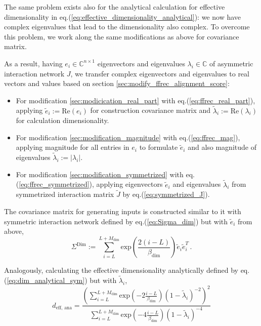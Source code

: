 \documentclass[11pt]{article}
\begin{document}
{	The same problem exists also for the analytical calculation for effective dimensionality in  eq.(\ref{eq:effective_dimensionality_analytical}): we now have complex eigenvalues that lead to the dimensionality also complex. To overcome this problem, we work along the same modifications as above for covariance matrix.
				  
	As a result, having $e_i \in \mathbb{C}^{n \times 1}$ eigenvectors and eigenvalues $\lambda_i \in \mathbb{C}$ of asymmetric interaction network $J$, we transfer complex eigenvectors and eigenvalues to real vectors and values based on section \ref{sec:modify_ffrec_alignment_score}: 
	  \begin{itemize}
			  	\item For modification \ref{sec:modicication_real_part} with eq.(\ref{eq:ffrec_real_part}), applying $\tilde{e}_i := \text{Re}(e_i)$ for construction covariance matrix and $\tilde{\lambda}_i := \text{Re}(\lambda_i)$ for calculation dimensionality.
			  	\item For modification \ref{sec:modification_magnitude} with eq.(\ref{eq:ffrec_mag}), applying magnitude for all entries in $e_i$ to formulate $\tilde{e}_i$ and  also magnitude of eigenvalues $\tilde{\lambda}_i := \vert \lambda_i \vert$. 
			  	\item For modification \ref{sec:modification_symmetrized} with eq.(\ref{eq:ffrec_symmetrized}), applying eigenvectors $\tilde{e}_i$ and eigenvalues $\tilde{\lambda}_i$ from symmetrized interaction matrix $\tilde{J}$ by  eq.(\ref{eq:symmetrized_J}).
	  \end{itemize}
			  		
  	 The covariance matrix for generating inputs is constructed similar to it with symmetric interaction network defined by  eq.(\ref{eq:Sigma_dim}) but with $\tilde{e}_i$ from above, 
  	  	\begin{equation} \label{eq:modifications_dim}
  	  		\Sigma^{\text{Dim}} := \sum_{i=L}^{L+M_{\text{dim}}} \text{exp}\left(\frac{2(i-L)}{\beta_{\text{dim}}}\right) \tilde{e}_i \tilde{e}_i^T \, .
  	  	\end{equation}
		  	  	
 	  Analogously, calculating the effective dimensionality analytically defined by eq.(\ref{eq:dim_analytical_sym}) but with $\tilde{\lambda}_i$,
  	  	  	\begin{equation} \label{eq:modification_eff_dim}
  	  	  		d_{\text{eff, ana}} = \frac{\left(\sum_{i = L}^{L + M_{\text{dim}}} \text{exp}\left(-2 \frac{i-L}{\beta_{\text{dim}}}\right)(1-\tilde{\lambda}_i)^{-2}\right)^2}{\sum_{i=L}^{L+M_{\text{dim}}} \text{exp}\left(-4 \frac{i-L}{\beta_{\text{dim}}}\right)(1-\tilde{\lambda}_i)^{-4}}
  	  	  	\end{equation}
		  	  	
}
\end{document}
